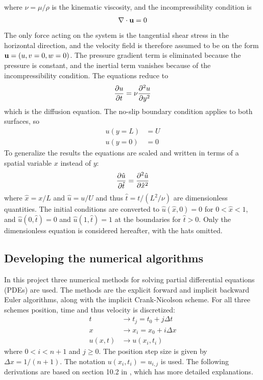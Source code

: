 \documentclass[aps,reprint]{revtex4-1}
\begin{document}
where $\nu = \mu/\rho$ is the kinematic viscosity, and the incompressibility
condition is
\begin{align*}
  \nabla \cdot \vb{u} = 0
\end{align*}
The only force acting on the system is the tangential shear stress in the
horizontal direction, and the velocity field is therefore assumed to be on the
form $\vb{u} = (u,v = 0,w = 0)$. The pressure gradient term is eliminated because the
pressure is constant, and the inertial term vanishes because of the incompressibility
condition. The equations reduce to
\begin{align}
  \pdv{u}{t} = \nu \pdv[2]{u}{y}
\end{align}
which is the diffusion equation. The no-slip boundary condition applies to both
surfaces, so
\begin{align*}
  u(y = L) &= U \\
  u(y = 0) &= 0
\end{align*}
To generalize the results the equations are scaled and written in terms of
a spatial variable $x$ instead of $y$:
\begin{align}
  \pdv{\hat{u}}{\hat{t}} = \pdv[2]{\hat{u}}{\hat{x}}
\end{align}
where $\hat{x} = x / L$ and $\hat{u} = u / U$ and thus $\hat{t} = t / (L^2 / \nu)$ are dimensionless quantities.
The initial conditions are converted to $\hat{u}(\hat{x},0) = 0$ for $0 < \hat{x} < 1$,
and $\hat{u}(0,\hat{t}) = 0$ and $\hat{u}(1,\hat{t}) = 1$ at the boundaries for $\hat{t} > 0$.
Only the dimensionless equation is considered hereafter, with the hats omitted.
\subsection{Developing the numerical algorithms}
In this project three numerical methods for solving partial differential equations (PDEs)
are used. The methods are the explicit forward and implicit backward Euler
algorithms, along with the implicit Crank-Nicolson scheme. For all three schemes
position, time and thus velocity is discretized:
\begin{align*}
  t &\rightarrow t_j = t_0 + j \Delta{t} \\
  x &\rightarrow x_i = x_0 + i \Delta{x} \\
  u(x,t) &\rightarrow u(x_i, t_i)
\end{align*}
where $0 < i < n + 1$ and $j \geq 0$. The position step size is given by $\Delta{x} = 1 /(n+1)$.
The notation $u(x_i,t_i) = u_{i,j}$ is used. The following derivations are based on
section 10.2 in \cite{mortenjensen}, which has more detailed explanations.
\end{document}
